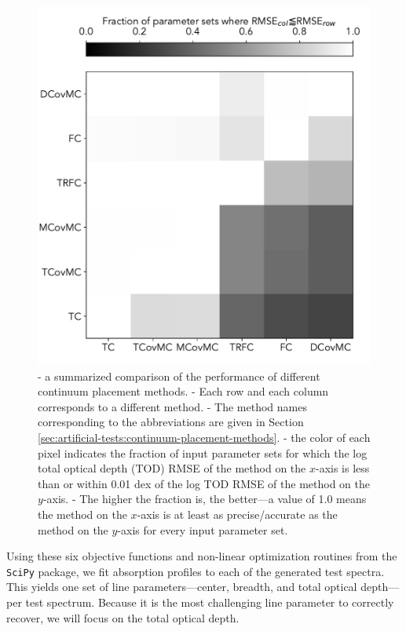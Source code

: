 \documentclass[trackchanges]{aastex62}
\begin{document}
{\begin{figure}
  \includegraphics[width=\linewidth]{figures/overall-performance.pdf}
  \caption{
  - a summarized comparison of the performance of different continuum placement methods.
  - Each row and each column corresponds to a different method.
  - The method names corresponding to the abbreviations are given in Section \ref{sec:artificial-tests:continuum-placement-methods}.
  - the color of each pixel indicates the fraction of input parameter sets for which the log total optical depth (TOD) RMSE of the method on the $x$-axis is less than or within 0.01 dex of the log TOD RMSE of the method on the $y$-axis.
  - The higher the fraction is, the better---a value of 1.0 means the method on the $x$-axis is at least as precise/accurate as the method on the $y$-axis for every input parameter set.
  }
  \label{fig:outcomes-summary}
\end{figure}
Using these six objective functions and non-linear optimization routines from the \texttt{SciPy} package, we fit absorption profiles to each of the generated test spectra.
This yields one set of line parameters---center, breadth, and total optical depth---per test spectrum.
Because it is the most challenging line parameter to correctly recover, we will focus on the total optical depth.
}
\end{document}
